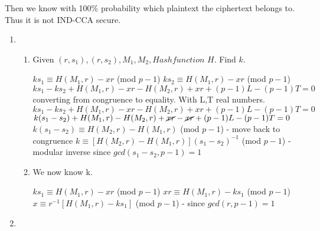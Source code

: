\documentclass{assignment}
\begin{document}
\begin{problemlist}
\begin{problem}
Then we know with 100\% probability which plaintext the ciphertext belongs to. \newline
Thus it is not IND-CCA secure.

\clearpage
\end{problem}


\begin{problem}
\pbitem
\begin{enumerate}
\item

\begin{enumerate}

\item

Given $(r,s_1),(r,s_2),M_1,M_2,Hash function$ $H$. Find $k$. \newline

$ks_1 \equiv H(M_1,r) - xr$ (mod $p-1$) \newline
$ks_2 \equiv H(M_1,r) - xr$ (mod $p-1$) \newline
$ks_1 - ks_2 + H(M_1,r) - xr - H(M_2,r) + xr + (p - 1)L - (p - 1)T = 0$ converting from congruence to equality. With L,T real numbers. \newline
$ks_1 - ks_2 + H(M_1,r) - xr - H(M_2,r) + xr + (p - 1)L - (p - 1)T = 0$\newline
$k(s_1 - s_2) + H(M_1,r) - H(M_2,r) + \cancel{xr} - \cancel{xr} + (p - 1)L - (p - 1)T = 0$\newline
$k(s_1 - s_2) \equiv H(M_2,r) - H(M_1,r)$ (mod $p-1$) - move back to congruence \newline
$k \equiv [H(M_2,r) - H(M_1,r)] (s_1 - s_2)^{-1}$ (mod $p-1$) - modular inverse since $gcd(s_1 - s_2, p-1) = 1$\newline

\item

We now know k. \newline

$ks_1 \equiv H(M_1,r) - xr$ (mod $p-1$)\newline
$xr \equiv H(M_1,r) -ks_1$ (mod $p-1$)\newline
$x \equiv r^{-1}[H(M_1,r) -ks_1]$ (mod $p-1$) - since $gcd(r,p-1) = 1$\newline

\end{enumerate}

\item

\begin{enumerate}


\end{enumerate}
\end{enumerate}
\end{problem}
\end{problemlist}
\end{document}
